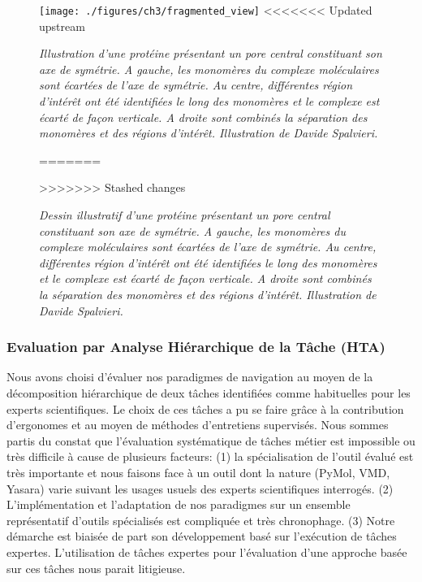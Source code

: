 \begin{figure}[h]
  \centering
  {\texttt{[image: ./figures/ch3/fragmented\_view]}}
<<<<<<< Updated upstream
    \caption{{\it Illustration d'une protéine présentant un pore central constituant son axe de symétrie. A gauche, les monomères du complexe moléculaires sont écartées de l'axe de symétrie. Au centre, différentes région d'intérêt ont été identifiées le long des monomères et le complexe est écarté de façon verticale. A droite sont combinés la séparation des monomères et des régions d'intérêt. Illustration de Davide Spalvieri.}}
=======
    \caption[Dessin illustratif d'une protéine présentant un pore central constituant son axe de symétrie.]{{\it Dessin illustratif d'une protéine présentant un pore central constituant son axe de symétrie. A gauche, les monomères du complexe moléculaires sont écartées de l'axe de symétrie. Au centre, différentes région d'intérêt ont été identifiées le long des monomères et le complexe est écarté de façon verticale. A droite sont combinés la séparation des monomères et des régions d'intérêt. Illustration de Davide Spalvieri.}}
>>>>>>> Stashed changes
  \label{Fig:fragmented_view}
  \hspace{0.2cm}
\end{figure}


\subsubsection{Evaluation par Analyse Hiérarchique de la Tâche (HTA)} \label{hta_eval}

Nous avons choisi d'évaluer nos paradigmes de navigation au moyen de la décomposition hiérarchique de deux tâches identifiées comme habituelles pour les experts scientifiques. Le choix de ces tâches a pu se faire grâce à la contribution d'ergonomes et au moyen de méthodes d'entretiens supervisés.
Nous sommes partis du constat que l'évaluation systématique de tâches métier est impossible ou très difficile à cause de plusieurs facteurs: (1) la spécialisation de l'outil évalué est très importante et nous faisons face à un outil dont la nature (PyMol, VMD, Yasara) varie suivant les usages usuels des experts scientifiques interrogés. (2) L'implémentation et l'adaptation de nos paradigmes sur un ensemble représentatif d'outils spécialisés est compliquée et très chronophage. (3) Notre démarche est biaisée de part son développement basé sur l'exécution de tâches expertes. L'utilisation de tâches expertes pour l'évaluation d'une approche basée sur ces tâches nous parait litigieuse. 

